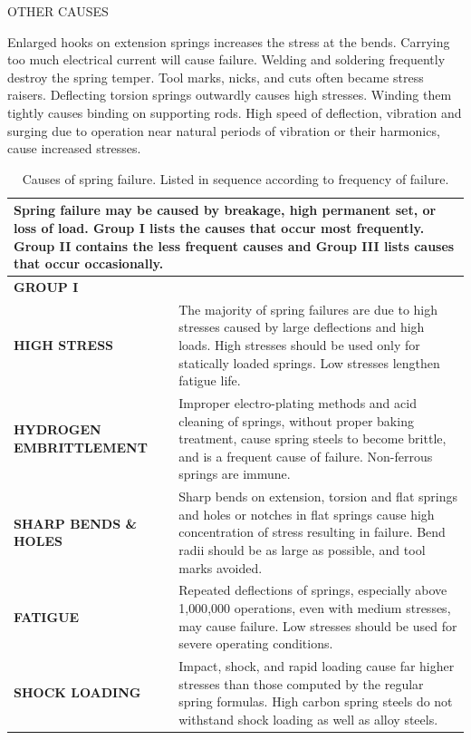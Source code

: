 \documentclass[10pt]{article}
\begin{document}
OTHER CAUSES

Enlarged hooks on extension springs increases the stress at the bends. 
Carrying too much electrical current will cause failure. 
Welding and soldering frequently destroy the spring temper. 
Tool marks, nicks, and cuts often became stress raisers. 
Deflecting torsion springs outwardly causes high stresses. 
Winding them tightly causes binding on supporting rods. 
High speed of deflection, vibration and surging due to operation near natural periods of vibration or their harmonics, cause increased stresses.

\begin{table}[h!]
\centering
\caption{Causes of spring failure. Listed in sequence according to frequency of failure.}
\begin{tabularx}{\textwidth}{|p{3cm}|p{12cm}|}
\hline
\multicolumn{2}{|l|}{\textbf{Spring failure may be caused by breakage, high permanent set, or loss of load. Group I lists the causes that occur most frequently. Group II contains the less frequent causes and Group III lists causes that occur occasionally.}} \\
\hline

\multicolumn{2}{|l|}{\textbf{GROUP I}} \\
\hline
\textbf{HIGH STRESS} &
The majority of spring failures are due to high stresses caused by large deflections and high loads. High stresses should be used only for statically loaded springs. Low stresses lengthen fatigue life. \\
\hline
\textbf{HYDROGEN EMBRITTLEMENT} &
Improper electro-plating methods and acid cleaning of springs, without proper baking treatment, cause spring steels to become brittle, and is a frequent cause of failure. Non-ferrous springs are immune. \\
\hline
\textbf{SHARP BENDS \& HOLES} &
Sharp bends on extension, torsion and flat springs and holes or notches in flat springs cause high concentration of stress resulting in failure. Bend radii should be as large as possible, and tool marks avoided. \\
\hline
\textbf{FATIGUE} &
Repeated deflections of springs, especially above 1{,}000{,}000 operations, even with medium stresses, may cause failure. Low stresses should be used for severe operating conditions. \\
\hline
\textbf{SHOCK LOADING} &
Impact, shock, and rapid loading cause far higher stresses than those computed by the regular spring formulas. High carbon spring steels do not withstand shock loading as well as alloy steels. \\
\hline


\end{tabularx}
\end{table}
\end{document}
